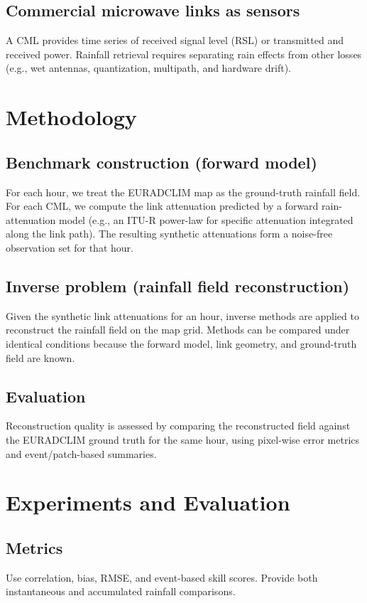 \documentclass[11pt]{article}
\begin{document}
\subsection{Commercial microwave links as sensors}
A CML provides time series of received signal level (RSL) or transmitted and received power. Rainfall retrieval requires separating rain effects from other losses (e.g., wet antennas, quantization, multipath, and hardware drift).

\section{Methodology}

\subsection{Benchmark construction (forward model)}
For each hour, we treat the EURADCLIM map as the ground-truth rainfall field. For each CML, we compute the link attenuation predicted by a forward rain-attenuation model (e.g., an ITU-R power-law for specific attenuation integrated along the link path). The resulting synthetic attenuations form a noise-free observation set for that hour.

\subsection{Inverse problem (rainfall field reconstruction)}
Given the synthetic link attenuations for an hour, inverse methods are applied to reconstruct the rainfall field on the map grid. Methods can be compared under identical conditions because the forward model, link geometry, and ground-truth field are known.

\subsection{Evaluation}
Reconstruction quality is assessed by comparing the reconstructed field against the EURADCLIM ground truth for the same hour, using pixel-wise error metrics and event/patch-based summaries.

\section{Experiments and Evaluation}

\subsection{Metrics}
Use correlation, bias, RMSE, and event-based skill scores. Provide both instantaneous and accumulated rainfall comparisons.
\end{document}
